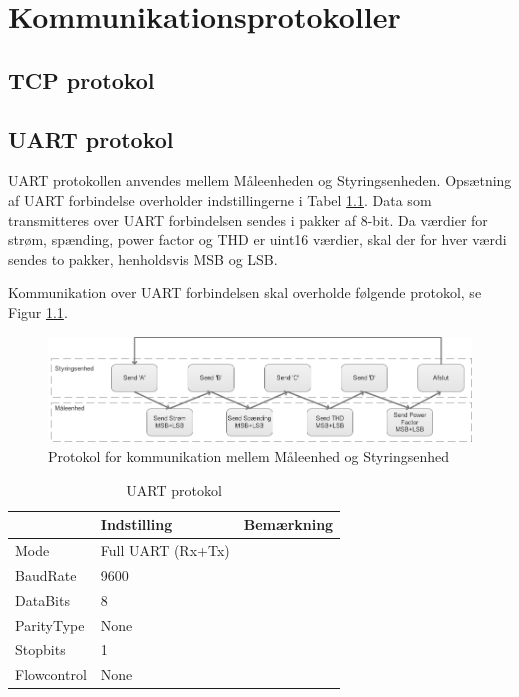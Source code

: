 
\chapter{Kommunikationsprotokoller}
\label{ch:KomProtokol}

\section{TCP protokol}
\label{TCPprotokol}

\section{UART protokol}
\label{sec:UARTprotokol}
UART protokollen anvendes mellem Måleenheden og Styringsenheden. Opsætning af UART forbindelse overholder indstillingerne i Tabel \ref{tab:UARTprotokol}. Data som transmitteres over UART forbindelsen sendes i pakker af 8-bit. Da værdier for strøm, spænding, power factor og THD er uint16 værdier, skal der for hver værdi sendes to pakker, henholdsvis MSB og LSB. 

Kommunikation over UART forbindelsen skal overholde følgende protokol, se Figur \ref{fig:UARTprotokol}.
\begin{figure}[H] %
	\centering
	\includegraphics[width=\textwidth]{Figure/UARTprotokol}
	\caption{Protokol for kommunikation mellem Måleenhed og Styringsenhed}
	\label{fig:UARTprotokol}
\end{figure}

\begin{table}[h]
	\centering
	\caption{UART protokol}
	\label{tab:UARTprotokol}
	\begin{tabular}{@{}lll@{}}
		\toprule
							& Indstilling       		& Bemærkning \\ \midrule
		Mode       		& Full UART (Rx+Tx) &            \\
		BaudRate 	  & 9600             		 &            \\
		DataBits    	& 8             			    &            \\
		ParityType 	  	& None     			         &            \\
		Stopbits    	& 1               				  &            \\
		Flowcontrol 	& None         		     &           \\ \hline
	\end{tabular}
\end{table}
